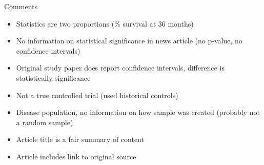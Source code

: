 \documentclass[xcolor=table, aspectratio=169, bigger]{beamer}
\begin{document}
\begin{frame}{Comments}
\begin{itemize}
\item Statistics are two proportions (\% survival at 36 months)
\item No information on statistical significance in news article (no p-value, no confidence intervals)
\item Original study paper does report confidence intervals, difference is statistically significance
\item Not a true controlled trial (used historical controls)
\item Disease population, no information on how sample was created (probably not a random sample)
\item Article title is a fair summary of content
\item Article includes link to original source
\end{itemize}
\end{frame}
\end{document}
